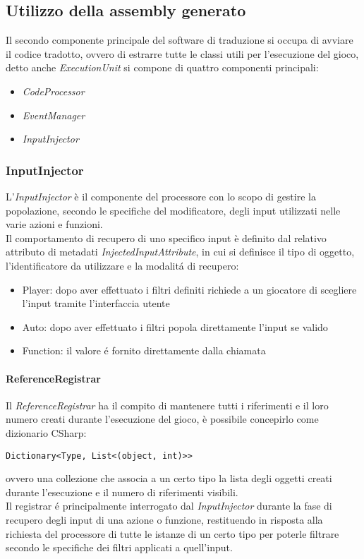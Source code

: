 \subsection{Utilizzo della assembly generato}
Il secondo componente principale del software di traduzione si occupa di avviare 
il codice tradotto, ovvero di estrarre tutte le classi utili per l'esecuzione 
del gioco, detto anche \textit{ExecutionUnit} si compone di quattro componenti principali:
\begin{itemize}
    \item \textit{CodeProcessor}
    \item \textit{EventManager}
    \item \textit{InputInjector}
\end{itemize}

\subsubsection{InputInjector}
L'\textit{InputInjector} è il componente del processore con lo scopo di gestire la popolazione, secondo le specifiche del modificatore,
degli input utilizzati nelle varie azioni e funzioni. \\ 
Il comportamento di recupero di uno specifico input è definito dal relativo attributo di metadati \textit{InjectedInputAttribute},
in cui si definisce il tipo di oggetto, l'identificatore da utilizzare e la modalitá di recupero:
\begin{itemize}
    \item Player: dopo aver effettuato i filtri definiti richiede a un giocatore di scegliere l'input tramite l'interfaccia utente
    \item Auto: dopo aver effettuato i filtri popola direttamente l'input se valido
    \item Function: il valore é fornito direttamente dalla chiamata  
\end{itemize}

\paragraph{ReferenceRegistrar}
Il \textit{ReferenceRegistrar} ha il compito di mantenere tutti i riferimenti e il loro numero
creati durante l'esecuzione del gioco, è possibile concepirlo come dizionario CSharp:
\begin{lstlisting}[style=sharpc_small]
Dictionary<Type, List<(object, int)>>    
\end{lstlisting}
ovvero una collezione che associa a un certo tipo la lista degli oggetti creati durante l'esecuzione 
e il numero di riferimenti visibili. \\
Il registrar é principalmente interrogato dal \textit{InputInjector} durante la fase di recupero degli input
di una azione o funzione, restituendo in risposta alla richiesta del processore di tutte le istanze di un certo tipo 
per poterle filtrare secondo le specifiche dei filtri applicati a quell'input.

